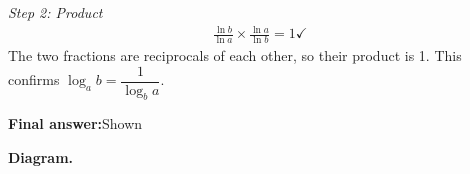 \documentclass[11pt]{article}
\begin{document}
\textit{Step 2: Product}
\[\begin{gathered}
\frac{\ln b}{\ln a} \times \frac{\ln a}{\ln b} = 1 \checkmark
\end{gathered}\]
The two fractions are reciprocals of each other, so their product is 1. This confirms \( \log_a b = \dfrac{1}{\log_b a} \).

\begin{answerbox}
\textbf{Final answer:}\quad Shown
\end{answerbox}
\textbf{Diagram.}

\begin{center}
\end{center}
\end{document}
